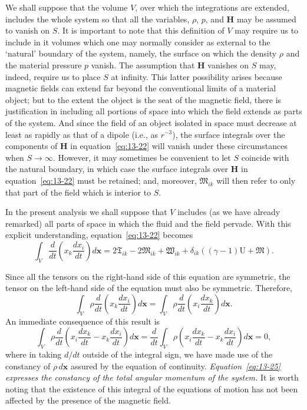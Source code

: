We shall suppose that the volume $V$, over which the integrations are extended, includes the whole system so that all the variables, $\rho$, $p$, and $\mathbf{H}$ may be assumed to vanish on $S$. It is important to note that this definition of $V$ may require us to include in it volumes which one may normally consider as external to the `natural' boundary of the system, namely, the surface on which the density $\rho$ and the material pressure $p$ vanish. The assumption that $\mathbf{H}$ vanishes on $S$ may, indeed, require us to place $S$ at infinity. This latter possibility arises because magnetic fields can extend far beyond the conventional limits of a material object; but to the extent the object is the seat of the magnetic field, there is justification in including all portions of space into which the field extends as parts of the system. And since the field of an object isolated in space must decrease at least as rapidly as that of a dipole (i.e., as $r^{-3}$), the surface integrals over the components of $\mathbf{H}$ in equation~\eqref{eq:13-22} will vanish under these circumstances when $S \to \infty$. However, it may sometimes be convenient to let $S$ coincide with the natural boundary, in which case the surface integrals over $\mathbf{H}$ in equation~\eqref{eq:13-22} must be retained; and, moreover, $\mathfrak{M}_{ik}$ will then refer to only that part of the field which is interior to $S$.

In the present analysis we shall suppose that $V$ includes (as we have already remarked) all parts of space in which the fluid and the field pervade. With this explicit understanding, equation~\eqref{eq:13-22} becomes
\begin{equation}
\label{eq:13-23}
\int_V \frac{d}{dt}\!\left(x_k\frac{dx_i}{dt}\right)d\mathbf{x}
= 2\mathfrak{T}_{ik} - 2\mathfrak{M}_{ik} + \mathfrak{W}_{ik} + \delta_{ik}((\gamma-1)\mathrm{U}+\mathfrak{M}).
\end{equation}

Since all the tensors on the right-hand side of this equation are symmetric, the tensor on the left-hand side of the equation must also be symmetric. Therefore,
\begin{equation}
\label{eq:13-24}
\int_V \rho \frac{d}{dt}\!\left(x_k\frac{dx_i}{dt}\right)d\mathbf{x} = \int_V \rho \frac{d}{dt}\!\left(x_i\frac{dx_k}{dt}\right)d\mathbf{x}.
\end{equation}
An immediate consequence of this result is
\begin{equation}
\label{eq:13-25}
\int_V \rho \frac{d}{dt}\!\left(x_i\frac{dx_k}{dt} - x_k\frac{dx_i}{dt}\right)d\mathbf{x} = \frac{d}{dt}\int_V \rho\!\left(x_i\frac{dx_k}{dt} - x_k\frac{dx_i}{dt}\right)d\mathbf{x} = 0,
\end{equation}
where in taking $d/dt$ outside of the integral sign, we have made use of the constancy of $\rho\,d\mathbf{x}$ assured by the equation of continuity. \textit{Equation~\eqref{eq:13-25} expresses the constancy of the total angular momentum of the system.} It is worth noting that the existence of this integral of the equations of motion has not been affected by the presence of the magnetic field.

